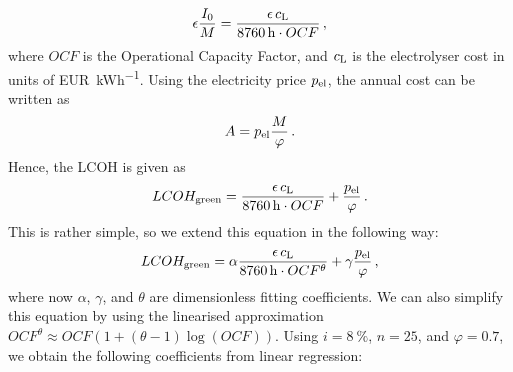 \documentclass[%
 draft,
 aapm,
 mph,%
 amsmath,amssymb,
 reprint,%
]{revtex4-2}
\begin{document}
\begin{equation}
    \epsilon \frac{I_0}{M} = \frac{\epsilon\,c_{\mathrm{L}}}{\SI{8760}{\hour} \cdot OCF} \,,
\end{equation}
where $OCF$ is the Operational Capacity Factor, and $c_{\mathrm{L}}$ is the electrolyser cost in units of \si{EUR\per\kWh}. Using the electricity price $p_{\mathrm{el}}$, the annual cost can be written as
\begin{equation}
    A  = p_{\mathrm{el}} \frac{M}{\varphi} \,.
\end{equation}
Hence, the LCOH is given as
\begin{equation}
    LCOH_{\mathrm{green}} = \frac{\epsilon\,c_{\mathrm{L}}}{\SI{8760}{\hour} \cdot OCF} + \frac{p_{\mathrm{el}}}{\varphi} \,.
\end{equation}
This is rather simple, so we extend this equation in the following way:
\begin{equation}
    LCOH_{\mathrm{green}} = \alpha \frac{\epsilon\,c_{\mathrm{L}}}{\SI{8760}{\hour} \cdot OCF^\theta} + \gamma \frac{p_{\mathrm{el}}}{\varphi} \,,
\end{equation}
where now $\alpha$, $\gamma$, and $\theta$ are dimensionless fitting coefficients. We can also simplify this equation by using the linearised approximation $OCF^\theta \approx OCF(1+(\theta-1)\log(OCF))$. Using $i = \SI{8}{\percent}$, $n = 25$, and $\varphi=0.7$, we obtain the following coefficients from linear regression:

\begin{table}[h!]
\end{table}
\end{document}
